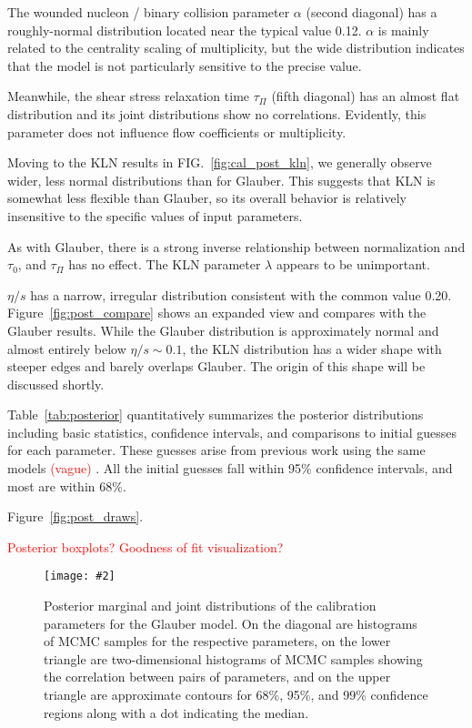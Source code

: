 \documentclass[aps,prc,reprint,amsmath]{revtex4-1}
\newcommand{\todo}[1]{\textcolor{red}{#1}}
\newcommand{\widefig}[3][t]{
  \begin{figure*}[#1]
    \texttt{[image: \#2]}
    \caption{\label{fig:#2}#3}
  \end{figure*}
}
\begin{document}
The wounded nucleon / binary collision parameter $\alpha$ (second diagonal) has a roughly-normal distribution located near the typical value 0.12.
$\alpha$ is mainly related to the centrality scaling of multiplicity, but the wide distribution indicates that the model is not particularly sensitive to the precise value.

Meanwhile, the shear stress relaxation time $\tau_\Pi$ (fifth diagonal) has an almost flat distribution and its joint distributions show no correlations.
Evidently, this parameter does not influence flow coefficients or multiplicity.

Moving to the KLN results in FIG.~\ref{fig:cal_post_kln}, we generally observe wider, less normal distributions than for Glauber.
This suggests that KLN is somewhat less flexible than Glauber, so its overall behavior is relatively insensitive to the specific values of input parameters.

As with Glauber, there is a strong inverse relationship between normalization and $\tau_0$, and $\tau_\Pi$ has no effect.
The KLN parameter $\lambda$ appears to be unimportant.

$\eta/s$ has a narrow, irregular distribution consistent with the common value 0.20.
Figure~\ref{fig:post_compare} shows an expanded view and compares with the Glauber results.
While the Glauber distribution is approximately normal and almost entirely below $\eta/s \sim 0.1$, the KLN distribution has a wider shape with steeper edges and barely overlaps Glauber.
The origin of this shape will be discussed shortly.

Table~\ref{tab:posterior} quantitatively summarizes the posterior distributions including basic statistics, confidence intervals, and comparisons to initial guesses for each parameter.
These guesses arise from previous work using the same models \todo{(vague)} \cite{Shen:2011zc,Heinz:2011kt}.
All the initial guesses fall within 95\% confidence intervals, and most are within 68\%.

Figure~\ref{fig:post_draws}.

\todo{
  Posterior boxplots?
  Goodness of fit visualization?
}

\widefig{cal_post_glb}{
  Posterior marginal and joint distributions of the calibration parameters for the Glauber model.
  On the diagonal are histograms of MCMC samples for the respective parameters,
  on the lower triangle are two-dimensional histograms of MCMC samples showing the correlation between pairs of parameters,
  and on the upper triangle are approximate contours for 68\%, 95\%, and 99\% confidence regions along with a dot indicating the median.
}
\end{document}
